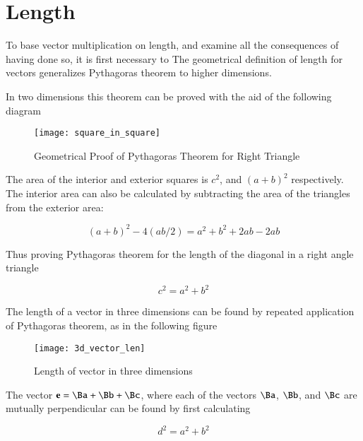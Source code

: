 \documentclass{article}      %
\title{} %
\author{Peeter Joot}         %
\date{ March 17, 2008.  Last Revision: $Date: 2009/06/03 20:01:38 $ }
\begin{document}

\maketitle{}

\section{Length}

To base vector multiplication on length, and examine all the consequences of having done so, it is first necessary to 
The geometrical definition of length for vectors generalizes Pythagoras theorem to higher dimensions.

In two dimensions this theorem can be proved with the aid of the following diagram

\begin{figure}[htp]
\centering
\texttt{[image: square\_in\_square]}
\caption{Geometrical Proof of Pythagoras Theorem for Right Triangle}\label{fig:phthagoras}
\end{figure}

The area of the interior and exterior squares is $c^2$, and $(a+b)^2$ respectively.  The interior area can also be calculated by subtracting the area of the triangles from the exterior area:

\[
(a+b)^2 - 4(ab/2) = a^2 + b^2 + 2ab - 2ab
\]

Thus proving Pythagoras theorem for the length of the diagonal in a right angle triangle

\[
c^2 = a^2 + b^2
\]


The length of a vector in three dimensions can be found by repeated application of Pythagoras theorem, as in the following figure 

\begin{figure}[htp]
\centering
\texttt{[image: 3d\_vector\_len]}
\caption{Length of vector in three dimensions}\label{fig:3dveclen}
\end{figure}

The vector $\Be = \Ba + \Bb + \Bc$, where each of the vectors $\Ba$, $\Bb$, and $\Bc$ are mutually perpendicular can be found by first calculating

\[
d^2 = a^2 + b^2
\]
\end{document}
